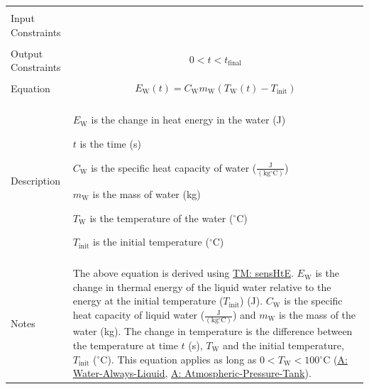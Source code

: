 \documentclass[12pt]{article}
\begin{document}
\begin{minipage}{\textwidth}
\begin{tabular}{>{\raggedright}p{}>{\raggedright\arraybackslash}p{}}
\\ \midrule \\
Input Constraints & 
\\ \midrule \\
Output Constraints & \begin{displaymath}
                     0<t<{t_{\text{final}}}
                     \end{displaymath}
\\ \midrule \\
Equation & \begin{displaymath}
           {E_{\text{W}}}\left(t\right)={C_{\text{W}}} {m_{\text{W}}} \left({T_{\text{W}}}\left(t\right)-{T_{\text{init}}}\right)
           \end{displaymath}
\\ \midrule \\
Description & \begin{symbDescription}
              \item{${E_{\text{W}}}$ is the change in heat energy in the water (J)}
              \item{$t$ is the time (s)}
              \item{${C_{\text{W}}}$ is the specific heat capacity of water ($\frac{\text{J}}{(\text{kg}{}^{\circ}\text{C})}$)}
              \item{${m_{\text{W}}}$ is the mass of water (kg)}
              \item{${T_{\text{W}}}$ is the temperature of the water (${}^{\circ}$C)}
              \item{${T_{\text{init}}}$ is the initial temperature (${}^{\circ}$C)}
              \end{symbDescription}
\\ \midrule \\
Notes & The above equation is derived using \hyperref[TM:sensHtE]{TM: sensHtE}. ${E_{\text{W}}}$ is the change in thermal energy of the liquid water relative to the energy at the initial temperature (${T_{\text{init}}}$) (J). ${C_{\text{W}}}$ is the specific heat capacity of liquid water ($\frac{\text{J}}{(\text{kg}{}^{\circ}\text{C})}$) and ${m_{\text{W}}}$ is the mass of the water (kg). The change in temperature is the difference between the temperature at time $t$ (s), ${T_{\text{W}}}$ and the initial temperature, ${T_{\text{init}}}$ (${}^{\circ}$C). This equation applies as long as $0<{T_{\text{W}}}<100$${}^{\circ}$C (\hyperref[assumpWAL]{A: Water-Always-Liquid}, \hyperref[assumpAPT]{A: Atmospheric-Pressure-Tank}).
        

\end{tabular}
\end{minipage}
\end{document}
